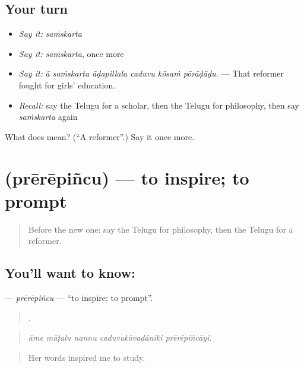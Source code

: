 \subsection*{Your turn}
\begin{itemize}
\raggedright
  \item \emph{Say it:} \emph{saṁskarta}
  \item \emph{Say it:} \emph{saṁskarta}, once more
  \item \emph{Say it:} \emph{ā saṁskarta āḍapillala caduvu kōsaṁ pōrāḍāḍu.} — That reformer fought for girls’ education.
  \item \emph{Recall:} say the Telugu for a scholar, then the Telugu for philosophy, then say \emph{saṁskarta} again
\end{itemize}

\begin{tcolorbox}[breakable,colback=teal!4,colframe=teal!35!black,title={Before you move on}]
What does  mean? (\textquotedblleft{}A reformer\textquotedblright{}.) Say it once more.
\end{tcolorbox}
\section[\texorpdfstring{\te{ప్రేరేపించు} (prērēpiñcu)}{ప్రేరేపించు (prērēpiñcu)}]{ (prērēpiñcu) — to inspire; to prompt}

\label{lesson:TE-C435-prerepincu}



\begin{quote}
Before the new one: say the Telugu for philosophy, then the Telugu for a reformer.
\end{quote}

\subsection*{You'll want to know: }
\textbf{} — \emph{prērēpiñcu} — \textquotedblleft{}to inspire; to prompt\textquotedblright{}.

\begin{quote}
    .
\end{quote}

\begin{quote}
\emph{āme māṭalu nannu caduvukōvaḍāniki prērēpiñcāyi.}
\end{quote}

\begin{quote}
Her words inspired me to study.
\end{quote}

